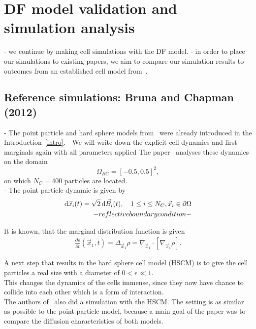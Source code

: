 \section{DF model validation and simulation analysis} \label{sanitycheck}
- we continue by making cell simulations with the DF model. 
- in order to place our simulations to existing papers, we aim to compare our simulation results to outcomes from an established cell model from~\cite{Bruna2012}. 

\subsection{Reference simulations: Bruna and Chapman (2012)}

- The point particle and hard sphere models from~\cite{Bruna2012} were already introduced in the Introduction~\ref{intro}. 
- We will write down the explicit cell dynamics and first marginals again with all parameters applied 
The paper~\cite{Bruna2012} analyses these dynamics on the domain 
\[\Omega_{BC} = [-0.5, 0.5]^2,\]
on which $N_{C} = 400$ particles are located. \\

- The point particle dynamic is given by
\begin{align*}
	\mathrm{d} \vec{x}_i(t) = \sqrt{2} \, \mathrm{d} \vec{B}_i(t), \quad 1 \leq i \leq N_C, \vec{x}_i \in \partial \Omega \\ 
    -reflective boundary condition-
\end{align*}


It is known, that the marginal distribution function is given 
\begin{align}
    \label{equ:marginalHeat}
    \frac{\partial \rho}{\partial t}(\vec{x}_1, t) = \Delta_{\vec{x}_1} \rho = \nabla_{\vec{x}_1} \cdot [ \nabla_{\vec{x}_1} \rho].
\end{align}

A next step that results in the hard sphere cell model (HSCM) is to give the cell particles a real size with a diameter of $0 < \epsilon \ll 1$. \\
This changes the dynamics of the cells immense, since they now have chance to collide into each other which is a form of interaction. \\
The authors of~\cite{Bruna2012} also did a simulation with the HSCM. 
The setting is as similar as possible to the point particle model, because a main goal of the paper was to compare the diffusion characteristics of both models. 

